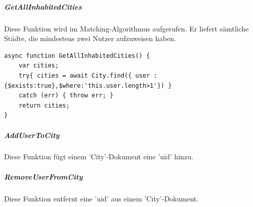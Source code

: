 \noindent
\subparagraph{GetAllInhabitedCities}
Diese Funktion wird im Matching-Algorithmus aufgerufen. Er liefert sämtliche Städte, die mindestens zwei Nutzer aufzuweisen haben. 

\begin{lstlisting}[caption=City Service - GetAllInhabitedCities, label=lst:cityServiceGetAllInhabitedCities]
async function GetAllInhabitedCities() {
    var cities;
    try{ cities = await City.find({ user : {$exists:true},$where:'this.user.length>1'}) }
    catch (err) { throw err; }
    return cities;
}
\end{lstlisting}

\noindent
\subparagraph{AddUserToCity}
Diese Funktion fügt einem 'City'-Dokument eine 'uid' hinzu.

\noindent
\subparagraph{RemoveUserFromCity}
Diese Funktion entfernt eine 'uid' aus einem 'City'-Dokument.
